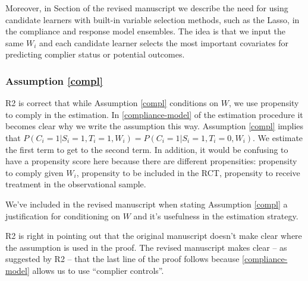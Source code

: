 \documentclass[hidelinks,12pt,letterpaper]{article}
\begin{document}
Moreover, in Section \label{ensemble} of the revised manuscript we describe the need for using candidate learners with built-in variable selection methods, such as the Lasso, in the compliance and response model ensembles. The idea is that we input the same $W_i$ and each candidate learner selects the most important covariates for predicting complier status or potential outcomes. 

\subsubsection{Assumption \ref{compl}}



R2 is correct that while Assumption \ref{compl} conditions on $W$, we use propensity to comply in the estimation.  In \ref{compliance-model} of the estimation procedure it becomes clear why we write the assumption this way. Assumption \ref{compl} implies that $P(C_i=1 | S_i=1, T_i=1, W_i) = P(C_i=1 | S_i=1, T_i=0, W_i)$. We estimate the first term to get to the second term. In addition, it would be confusing to have a propensity score here because there are different propensities: propensity to comply given $W_i$, propensity to be included in the RCT, propensity to receive treatment in the observational sample. 

We've included in the revised manuscript when stating Assumption \ref{compl} a justification for conditioning on $W$ and it's usefulness in the estimation strategy.

R2 is right in pointing out that the original manuscript doesn't make clear where the assumption is used in the proof. The revised manuscript makes clear -- as suggested by R2 -- that the last line of the proof follows because \ref{compliance-model} allows us to use ``complier controls''. 
\end{document}
